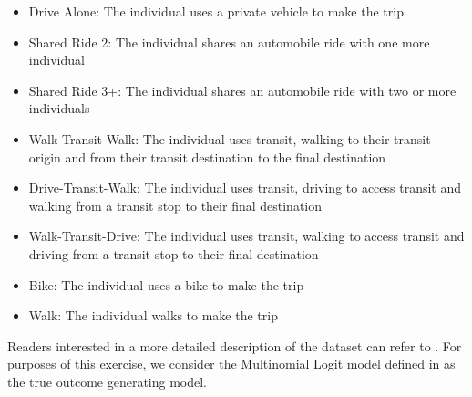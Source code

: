 \begin{itemize}
   \item Drive Alone: The individual uses a private vehicle to make the trip
   \item Shared Ride 2: The individual shares an automobile ride with one more individual
   \item Shared Ride 3+: The individual shares an automobile ride with two or more individuals
   \item Walk-Transit-Walk: The individual uses transit, walking to their transit origin and from their transit destination to the final destination
   \item Drive-Transit-Walk: The individual uses transit, driving to access transit and walking from a transit stop to their final destination
   \item Walk-Transit-Drive: The individual uses transit, walking to access transit and driving from a transit stop to their final destination
   \item Bike: The individual uses a bike to make the trip
   \item Walk: The individual walks to make the trip
\end{itemize}

Readers interested in a more detailed description of the dataset can refer to \citet{brathwaite_asymmetric}.
For purposes of this exercise, we consider the Multinomial Logit model defined in \citet{brathwaite_asymmetric} as the true outcome generating model.

